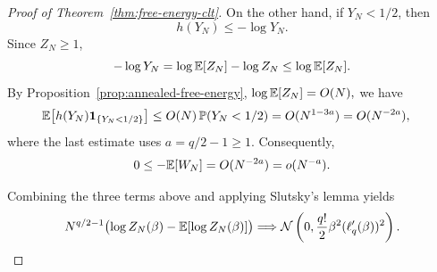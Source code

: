 \documentclass[../CLT_SYK.tex]{subfiles}
\begin{document}
\begin{proof}[Proof of {Theorem~\ref{thm:free-energy-clt}}]
On the other hand, if $Y_N<1/2$, then
\[
h(Y_N)\le-\log Y_N.
\]
Since $Z_N\ge1$,
\[
-\log Y_N
=
\log\mathbb E[Z_N]-\log Z_N
\le
\log\mathbb E[Z_N].
\]
By Proposition~\ref{prop:annealed-free-energy},
\(
\log\mathbb E[Z_N]=O(N),
\) 
we have
\begin{align*}
\mathbb E\!\left[
h(Y_N)\mathbf 1_{\{Y_N<1/2\}}
\right]
&\le
O(N)\,\mathbb P(Y_N<1/2)=
O(N^{1-3a})
=O(N^{-2a}),
\end{align*}
where the last estimate uses $a=q/2-1\geq1$.
Consequently,
\[
0\le-\mathbb E[W_N]
=
O(N^{-2a})
=o(N^{-a}).
\]

Combining the three terms above and applying {Slutsky's lemma
\cite[Theorem~3.1]{Billingsley1999}} yields
\[
N^{q/2-1}
\bigl(
\log Z_N(\beta)-\mathbb E[\log Z_N(\beta)]
\bigr)
\Longrightarrow
\mathcal N\left(
0,\frac{q!}{2}\beta^2(\ell_q'(\beta))^2
\right).
\]
\end{proof}
\end{document}
